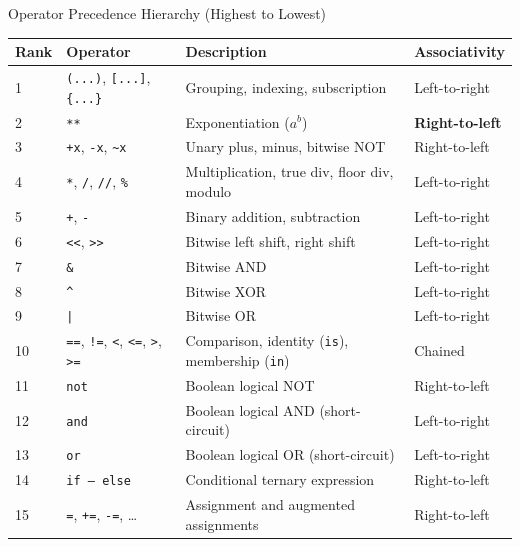 \begin{formulabox}{Operator Precedence Hierarchy (Highest to Lowest)}
\begin{center}
\begin{tabularx}{0.96\textwidth}{l l X l}
\toprule
\textbf{Rank} & \textbf{Operator} & \textbf{Description} & \textbf{Associativity} \\
\midrule
1 & \texttt{(...)}, \texttt{[...]}, \texttt{\{...\}} & Grouping, indexing, subscription & Left-to-right \\
2 & \texttt{**} & Exponentiation ($a^b$) & \textbf{Right-to-left} \\
3 & \texttt{+x}, \texttt{-x}, \texttt{\textasciitilde{}x} & Unary plus, minus, bitwise NOT & Right-to-left \\
4 & \texttt{*}, \texttt{/}, \texttt{//}, \texttt{\%} & Multiplication, true div, floor div, modulo & Left-to-right \\
5 & \texttt{+}, \texttt{-} & Binary addition, subtraction & Left-to-right \\
6 & \texttt{<<}, \texttt{>>} & Bitwise left shift, right shift & Left-to-right \\
7 & \texttt{\&} & Bitwise AND & Left-to-right \\
8 & \texttt{\textasciicircum{}} & Bitwise XOR & Left-to-right \\
9 & \texttt{|} & Bitwise OR & Left-to-right \\
10 & \texttt{==}, \texttt{!=}, \texttt{<}, \texttt{<=}, \texttt{>}, \texttt{>=} & Comparison, identity (\texttt{is}), membership (\texttt{in}) & Chained \\
11 & \texttt{not} & Boolean logical NOT & Right-to-left \\
12 & \texttt{and} & Boolean logical AND (short-circuit) & Left-to-right \\
13 & \texttt{or} & Boolean logical OR (short-circuit) & Left-to-right \\
14 & \texttt{if -- else} & Conditional ternary expression & Right-to-left \\
15 & \texttt{=}, \texttt{+=}, \texttt{-=}, \dots & Assignment and augmented assignments & Right-to-left \\
\bottomrule
\end{tabularx}
\end{center}
\end{formulabox}

